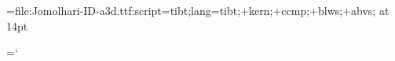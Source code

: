 \documentclass{article}
\begin{document}

\font\tibetfont=file:Jomolhari-ID-a3d.ttf:script=tibt;lang=tibt;+kern;+ccmp;+blws;+abvs; at 14pt

\tibetfont

\exhyphenchar=`\་

\end{document}
